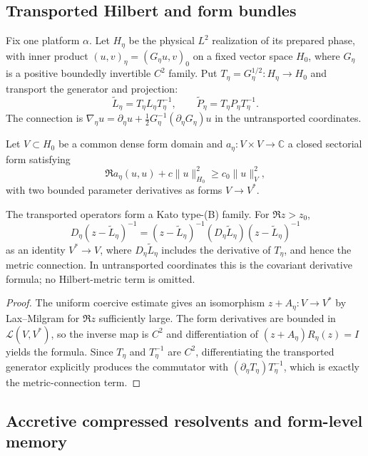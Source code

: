 \subsection{Transported Hilbert and form bundles}

Fix one platform $\alpha$.  Let $H_\eta$ be the physical $L^2$ realization of
its prepared phase, with inner product
$(u,v)_\eta=(G_\eta u,v)_0$ on a fixed vector space $H_0$, where $G_\eta$ is a
positive boundedly invertible $C^2$ family.  Put
$T_\eta=G_\eta^{1/2}:H_\eta\to H_0$ and transport the generator and projection:
\[
 \widetilde L_\eta=T_\eta L_\eta T_\eta^{-1},
 \qquad
 \widetilde P_\eta=T_\eta P_\eta T_\eta^{-1}.
\]
The connection is
$\nabla_\eta u=\partial_\eta u+\frac12G_\eta^{-1}
(\partial_\eta G_\eta)u$ in the untransported coordinates.

Let $V\subset H_0$ be a common dense form domain and
$a_\eta:V\times V\to\mathbb C$ a closed sectorial form satisfying
\[
 \Re a_\eta(u,u)+c\|u\|_{H_0}^2\ge c_0\|u\|_V^2,
\]
with two bounded parameter derivatives as forms $V\to V^*$.

\begin{theorem}
\label{thm:r17-c2-connection}
The transported operators form a Kato type-(B) family.  For
$\Re z>z_0$,
\[
 D_\eta(z-\widetilde L_\eta)^{-1}
 =(z-\widetilde L_\eta)^{-1}
 (D_\eta\widetilde L_\eta)
 (z-\widetilde L_\eta)^{-1}
\]
as an identity $V^*\to V$, where
$D_\eta\widetilde L_\eta$ includes the derivative of
$T_\eta$, and hence the metric connection.  In untransported coordinates
this is the covariant derivative formula; no Hilbert-metric term is omitted.
\end{theorem}

\begin{proof}
The uniform coercive estimate gives an isomorphism
$z+A_\eta:V\to V^*$ by Lax--Milgram for $\Re z$ sufficiently large.
The form derivatives are bounded in $\mathcal L(V,V^*)$, so the inverse map is
$C^2$ and differentiation of
$(z+A_\eta)R_\eta(z)=I$ yields the formula.  Since
$T_\eta$ and $T_\eta^{-1}$ are $C^2$, differentiating the transported
generator explicitly produces the commutator with
$(\partial_\eta T_\eta)T_\eta^{-1}$, which is exactly the
metric-connection term.
\end{proof}

\subsection{Accretive compressed resolvents and form-level memory}

